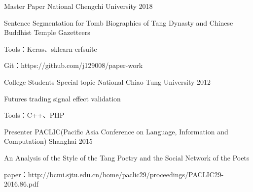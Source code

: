 

\begin{cventries}
  \cventry
    {Master} %
    {Paper} %
    {National Chengchi University} %
    {2018} %
    {
      \begin{cvitems} %
        \item {Sentence Segmentation for Tomb Biographies of Tang Dynasty and Chinese Buddhist Temple Gazetteers}
        \item {Tools：Keras、sklearn-crfsuite}
        \item {Git：https://github.com/j129008/paper-work}
      \end{cvitems}
    }

  \cventry
    {College Students} %
    {Special topic} %
    {National Chiao Tung University} %
    {2012} %
    {
      \begin{cvitems} %
      \item {Futures trading signal effect validation}
        \item {Tools：C++、PHP}
      \end{cvitems}
    }

  \cventry
    {Presenter} %
    {PACLIC(Pacific Asia Conference on Language, Information and
    Computation)} %
    {Shanghai} %
    {2015} %
    {
      \begin{cvitems} %
      \item { An Analysis of the Style of the Tang Poetry and the Social Network of the Poets} %
        \item {paper：http://bcmi.sjtu.edu.cn/home/paclic29/proceedings/PACLIC29-2016.86.pdf}
      \end{cvitems}
    }



\end{cventries}
